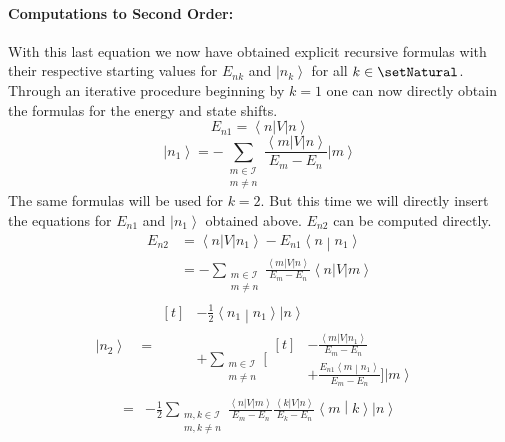 \documentclass[10pt,fleqn]{article}
\newcommand{\bra}[1]{\left\langle #1 \right\vert}
\newcommand{\ket}[1]{\left\vert #1 \right\rangle}
\newcommand{\bracket}[2]{\left\langle #1 \middle\vert #2 \right\rangle}
\begin{document}
\begin{multicols}{2}
      \paragraph{Computations to Second Order:}
      With this last equation we now have obtained explicit recursive formulas with their respective starting values for $E_{nk}$ and $\ket{n_k}$ for all $k\in\setNatural$.
      Through an iterative procedure beginning by $k=1$ one can now directly obtain the formulas for the energy and state shifts.
      \[
        E_{n1} = \bra{n}V\ket{n}
      \]
      \[
        \ket{n_1} = - \sum_{\substack{m\in\mathscr{I} \\ m\neq n}} \frac{\bra{m}V\ket{n}}{E_m-E_n} \ket{m}
      \]
      The same formulas will be used for $k=2$.
      But this time we will directly insert the equations for $E_{n1}$ and $\ket{n_1}$ obtained above.
      $E_{n2}$ can be computed directly.
      \[
        \begin{aligned}
          E_{n2}
          &= \bra{n}V\ket{n_1} - E_{n1}\bracket{n}{n_1} \\
          &= -\sum_{\substack{m\in\mathscr{I} \\ m\neq n}} \frac{\bra{m}V\ket{n}}{E_m-E_n} \bra{n}V\ket{m}
        \end{aligned}
      \]
      \[
        \begin{aligned}
          \ket{n_2}
          &=
            \begin{aligned}[t]
              &-\frac{1}{2} \bracket{n_1}{n_{1}}\ket{n} \\
              &+ \sum_{\substack{m\in\mathscr{I}\\m\neq n}} \bigg[
                \begin{aligned}[t]
                  &-\frac{\bra{m}V\ket{n_{1}}}{E_m-E_n} \\
                  &+ \frac{E_{n1}\bracket{m}{n_{1}}}{E_m - E_n} \bigg] \ket{m}
                \end{aligned}
            \end{aligned}
        \end{aligned}
      \]
      \[
        \begin{aligned}
          = &-\frac{1}{2} \sum_{\substack{m,k\in\mathscr{I}\\m,k\neq n}} \frac{\bra{n}V\ket{m}}{E_m-E_n} \frac{\bra{k}V\ket{n}}{E_k-E_n} \bracket{m}{k} \ket{n} \\

\end{aligned}\]
\end{multicols}
\end{document}
